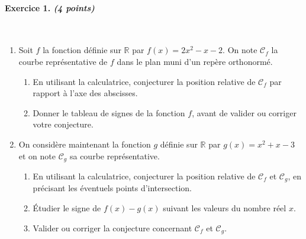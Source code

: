 \documentclass[11pt]{article}
\begin{document}
\paragraph{Exercice 1. \emph{(4 points)}}~\\
\begin{enumerate} %
  \item Soit $f$ la fonction définie sur $\mathbb{R}$ par $f(x)
= 2x^2-x-2$. On note $\mathscr C_f$ la courbe représentative de $f$ dans le plan
muni d'un repère orthonormé.
\begin{enumerate}
  \item En utilisant la calculatrice, conjecturer la position relative de
    $\mathscr C_f$ par rapport à l'axe des abscisses.
  \item Donner le tableau de signes de la fonction $f$, avant de valider ou
    corriger votre conjecture.
\end{enumerate}
\item On considère maintenant la fonction $g$ définie sur $\mathbb{R}$ par
$g(x)=x^2+x-3$ et on note $\mathscr C_g$ sa courbe représentative.
\begin{enumerate}
  \item En utilisant la calculatrice, conjecturer la position relative de
    $\mathscr C_f$ et $\mathscr C_g$, en précisant les éventuels points
    d'intersection.
  \item Étudier le signe de $f(x)-g(x)$ suivant les valeurs du nombre réel $x$.
  \item Valider ou corriger la conjecture concernant $\mathscr C_f$ et $\mathscr
    C_g$.
\end{enumerate}
\end{enumerate}
\end{document}

